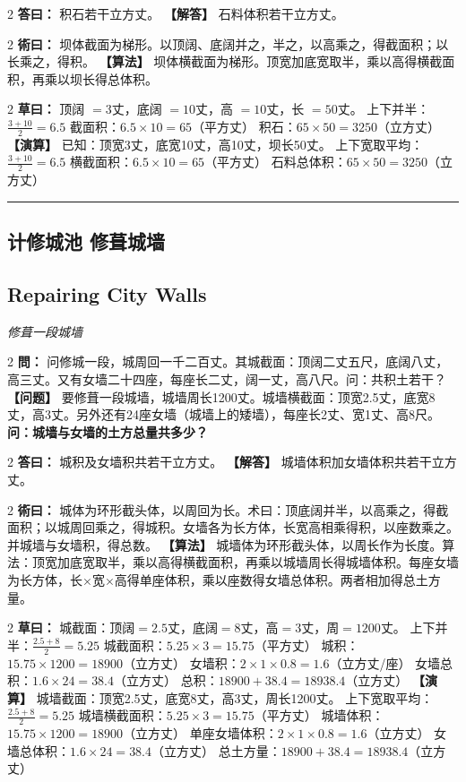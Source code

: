 \documentclass[11pt,a4paper]{article}
\newcommand{\longline}{\noindent\rule{\textwidth}{0.4pt}}
\newcommand{\bilingualProblem}[2]{%
  \vspace{0.6em}%
  \begin{paracol}{2}%
  \noindent\textcolor{problemcolor}{\textbf{問：}}#1%
  \switchcolumn%
  \noindent\textcolor{problemcolor}{\textbf{【问题】}}#2%
  \end{paracol}%
  \vspace{0.3em}%
}
\newcommand{\bilingualAnswer}[2]{%
  \begin{paracol}{2}%
  \noindent\textcolor{answercolor}{\textbf{答曰：}}#1%
  \switchcolumn%
  \noindent\textcolor{answercolor}{\textbf{【解答】}}#2%
  \end{paracol}%
  \vspace{0.3em}%
}
\newcommand{\bilingualMethod}[2]{%
  \begin{paracol}{2}%
  \noindent\textcolor{methodcolor}{\textbf{術曰：}}#1%
  \switchcolumn%
  \noindent\textcolor{methodcolor}{\textbf{【算法】}}#2%
  \end{paracol}%
  \vspace{0.3em}%
}
\newcommand{\bilingualWorking}[2]{%
  \begin{paracol}{2}%
  \noindent\textcolor{workingcolor}{\textbf{草曰：}}#1%
  \switchcolumn%
  \noindent\textcolor{workingcolor}{\textbf{【演算】}}#2%
  \end{paracol}%
  \vspace{0.3em}%
}
\newcommand{\bilingualSubsection}[2]{%
  \subsection{#1}
  \begin{center}
  {\small\color{sectioncolor}\textit{#2}}
  \end{center}
  \vspace{0.3em}
}
\begin{document}
\bilingualAnswer{%
积石若干立方丈。%
}{%
石料体积若干立方丈。%
}

\bilingualMethod{%
坝体截面为梯形。以顶阔、底阔并之，半之，以高乘之，得截面积；以长乘之，得积。%
}{%
坝体横截面为梯形。顶宽加底宽取半，乘以高得横截面积，再乘以坝长得总体积。%
}

\bilingualWorking{%
顶阔 $=3$丈，底阔 $=10$丈，高 $=10$丈，长 $=50$丈。
上下并半：$\displaystyle\frac{3+10}{2} = 6.5$
截面积：$6.5 \times 10 = 65$（平方丈）
积石：$65 \times 50 = 3250$（立方丈）%
}{%
已知：顶宽3丈，底宽10丈，高10丈，坝长50丈。
上下宽取平均：$\displaystyle\frac{3+10}{2} = 6.5$
横截面积：$6.5 \times 10 = 65$（平方丈）
石料总体积：$65 \times 50 = 3250$（立方丈）%
}

\vspace{0.5em}
\longline

\subsection{计修城池 \quad 修葺城墙}
\bilingualSubsection{Repairing City Walls}{修葺一段城墙}

\bilingualProblem{%
问修城一段，城周回一千二百丈。其城截面：顶阔二丈五尺，底阔八丈，高三丈。又有女墙二十四座，每座长二丈，阔一丈，高八尺。问：共积土若干？%
}{%
要修葺一段城墙，城墙周长1200丈。城墙横截面：顶宽2.5丈，底宽8丈，高3丈。另外还有24座女墙（城墙上的矮墙），每座长2丈、宽1丈、高8尺。\textbf{问：城墙与女墙的土方总量共多少？}%
}

\bilingualAnswer{%
城积及女墙积共若干立方丈。%
}{%
城墙体积加女墙体积共若干立方丈。%
}

\bilingualMethod{%
城体为环形截头体，以周回为长。术曰：顶底阔并半，以高乘之，得截面积；以城周回乘之，得城积。女墙各为长方体，长宽高相乘得积，以座数乘之。并城墙与女墙积，得总数。%
}{%
城墙体为环形截头体，以周长作为长度。算法：顶宽加底宽取半，乘以高得横截面积，再乘以城墙周长得城墙体积。每座女墙为长方体，长×宽×高得单座体积，乘以座数得女墙总体积。两者相加得总土方量。%
}

\bilingualWorking{%
城截面：顶阔$=2.5$丈，底阔$=8$丈，高$=3$丈，周$=1200$丈。
上下并半：$\displaystyle\frac{2.5+8}{2} = 5.25$
城截面积：$5.25 \times 3 = 15.75$（平方丈）
城积：$15.75 \times 1200 = 18900$（立方丈）
女墙积：$2 \times 1 \times 0.8 = 1.6$（立方丈/座）
女墙总积：$1.6 \times 24 = 38.4$（立方丈）
总积：$18900 + 38.4 = 18938.4$（立方丈）%
}{%
城墙截面：顶宽2.5丈，底宽8丈，高3丈，周长1200丈。
上下宽取平均：$\displaystyle\frac{2.5+8}{2} = 5.25$
城墙横截面积：$5.25 \times 3 = 15.75$（平方丈）
城墙体积：$15.75 \times 1200 = 18900$（立方丈）
单座女墙体积：$2 \times 1 \times 0.8 = 1.6$（立方丈）
女墙总体积：$1.6 \times 24 = 38.4$（立方丈）
总土方量：$18900 + 38.4 = 18938.4$（立方丈）%
}
\end{document}
